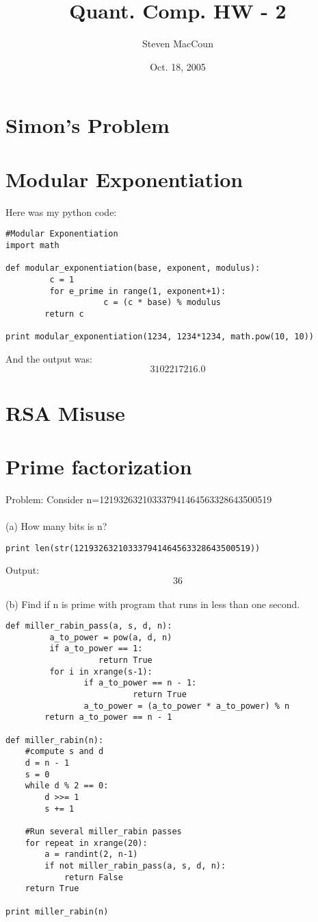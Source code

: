 \documentclass[12pt]{article}
\title{Quant. Comp. HW - 2}
\author{Steven MacCoun}
\date{Oct. 18, 2005}
\begin{document}
\maketitle						%



\section{Simon's Problem}


\section{Modular Exponentiation}

Here was my python code:

\begin{verbatim}
#Modular Exponentiation
import math

def modular_exponentiation(base, exponent, modulus):
         c = 1
         for e_prime in range(1, exponent+1):
                    c = (c * base) % modulus
        return c

print modular_exponentiation(1234, 1234*1234, math.pow(10, 10))
\end{verbatim}
And the output was: \[\boxed{3102217216.0}\] 


\section{RSA Misuse}

\section{Prime factorization}

Problem: Consider n=121932632103337941464563328643500519
\\\\(a) How many bits is n?
\begin{verbatim}
print len(str(121932632103337941464563328643500519))
\end{verbatim}
Output:  \[\boxed{36}\] 
\\(b) Find if n is prime with program that runs in less than one second.
\begin{verbatim}
def miller_rabin_pass(a, s, d, n):
         a_to_power = pow(a, d, n)
         if a_to_power == 1:
                   return True
         for i in xrange(s-1):
                if a_to_power == n - 1:
                          return True
                a_to_power = (a_to_power * a_to_power) % n
        return a_to_power == n - 1

def miller_rabin(n):
	#compute s and d
	d = n - 1
	s = 0
	while d % 2 == 0:
		d >>= 1
		s += 1

	#Run several miller_rabin passes
	for repeat in xrange(20):
		a = randint(2, n-1)
		if not miller_rabin_pass(a, s, d, n):
			return False
	return True

print miller_rabin(n)
\end{verbatim}
\end{document}
